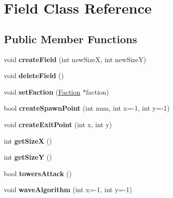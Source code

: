 \hypertarget{class_field}{}\section{Field Class Reference}
\label{class_field}
\subsection*{Public Member Functions}
\begin{DoxyCompactItemize}
\item 
\hypertarget{class_field_afbcc5401dcbb1420b577c956f15bc16b}{}void {\bfseries create\+Field} (int new\+Size\+X, int new\+Size\+Y)\label{class_field_afbcc5401dcbb1420b577c956f15bc16b}

\item 
\hypertarget{class_field_a54207affb7a965429a44eabd144c6ac6}{}void {\bfseries delete\+Field} ()\label{class_field_a54207affb7a965429a44eabd144c6ac6}

\item 
\hypertarget{class_field_af48ae49cbf20499826666d03cf3bf9e2}{}void {\bfseries set\+Faction} (\hyperlink{class_faction}{Faction} $\ast$faction)\label{class_field_af48ae49cbf20499826666d03cf3bf9e2}

\item 
\hypertarget{class_field_a0da7c43e0a079ee12b8893cf8b3cacd0}{}bool {\bfseries create\+Spawn\+Point} (int num, int x=-\/1, int y=-\/1)\label{class_field_a0da7c43e0a079ee12b8893cf8b3cacd0}

\item 
\hypertarget{class_field_a9607ff63143ceeacfbd09a55d1137d9c}{}void {\bfseries create\+Exit\+Point} (int x, int y)\label{class_field_a9607ff63143ceeacfbd09a55d1137d9c}

\item 
\hypertarget{class_field_a62cba816d93098cafcff3ba9f029e202}{}int {\bfseries get\+Size\+X} ()\label{class_field_a62cba816d93098cafcff3ba9f029e202}

\item 
\hypertarget{class_field_ab9d71038432c5502c6e230f21c7603ed}{}int {\bfseries get\+Size\+Y} ()\label{class_field_ab9d71038432c5502c6e230f21c7603ed}

\item 
\hypertarget{class_field_a025771376d1d895f02cceffe0e413607}{}bool {\bfseries towers\+Attack} ()\label{class_field_a025771376d1d895f02cceffe0e413607}

\item 
\hypertarget{class_field_a04bc0e1894ba2bd1a903dcb9c5856fa5}{}void {\bfseries wave\+Algorithm} (int x=-\/1, int y=-\/1)\label{class_field_a04bc0e1894ba2bd1a903dcb9c5856fa5}


\end{DoxyCompactItemize}

